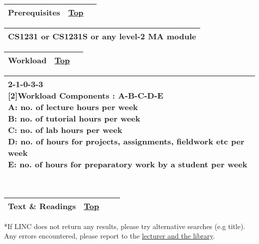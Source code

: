 { }

\begin{longtable}[]{@{}ll@{}}
\toprule
{\protect\hypertarget{Prerequisites}{}{}Prerequisites} &
{\protect\hyperlink{top}{Top}~~}\tabularnewline
\bottomrule
\end{longtable}

\begin{longtable}[]{@{}l@{}}
\toprule
\protect\hypertarget{ctl00_ctl00_ContentPlaceHolder1_ContentPlaceHolder1_LV_CourseInfo_ctrl0_lblCourseInfo}{}{CS1231
or CS1231S or any level-2 MA module}\tabularnewline
\bottomrule
\end{longtable}

\begin{longtable}[]{@{}ll@{}}
\toprule
{\protect\hypertarget{Workload}{}{}Workload} &
{\protect\hyperlink{top}{Top}~~}\tabularnewline
\bottomrule
\end{longtable}

\begin{longtable}[]{@{}l@{}}
\toprule
\protect\hypertarget{ctl00_ctl00_ContentPlaceHolder1_ContentPlaceHolder1_LV_CourseInfo_ctrl1_lblCourseInfo}{}{2-1-0-3-3\\[2\baselineskip]Workload
Components : A-B-C-D-E\\
A: no. of lecture hours per week\\
B: no. of tutorial hours per week\\
C: no. of lab hours per week\\
D: no. of hours for projects, assignments, fieldwork etc per week\\
E: no. of hours for preparatory work by a student per
week}\tabularnewline
\bottomrule
\end{longtable}

~

\hypertarget{ctl00_ctl00_ContentPlaceHolder1_ContentPlaceHolder1_pnlReferences}{}
\begin{longtable}[]{@{}lll@{}}
\toprule
{\protect\hypertarget{References}{}{}Text \& Readings} &
{\protect\hyperlink{top}{Top}} & {~~}\tabularnewline
\bottomrule
\end{longtable}

\protect\hypertarget{ctl00_ctl00_ContentPlaceHolder1_ContentPlaceHolder1_lblDisclaimer}{}{*If
LINC does not return any results, please try alternative searches (e.g
title). Any errors encountered, please report to the
\href{mailto:clbfrm05@nus.edu.sg?cc=e0210471@u.nus.edu\&subject=IVLE:\%20ISBN\%20Error\&body=Errors\%20encountered\%0A\%0AFrom\%20Module\%20\%5BCS4232\%5D\%20Outline\%20\%3E\%3E\%20under\%20Text\%20and\%20Readings\%20Section\%0A\%0AThis\%20is\%20a\%20system\%20generated\%20email,\%20please\%20do\%20not\%20reply.\%0A\%0ARegards,\%0AIVLE\%20Team}{lecturer
and the library}.}

